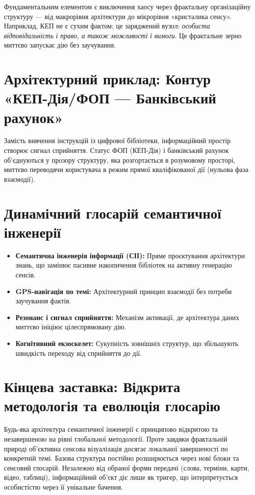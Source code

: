 \documentclass[11pt,a4paper]{article}
\begin{document}
Фундаментальним елементом є виключення хаосу через фрактальну організаційну структуру — від макрорівня архітектури до мікрорівня «кристалика сенсу». Наприклад, КЕП не є сухим фактом; це заряджений вузол: \textit{особиста відповідальність і право, а також можливості і вимоги}. Це фрактальне зерно миттєво запускає дію без заучування.

\section{Архітектурний приклад: Контур «КЕП-Дія/ФОП — Банківський рахунок»}
Замість вивчення інструкцій із цифрової бібліотеки, інформаційний простір створює сигнал сприйняття. Статус ФОП (КЕП-Дія) і банківський рахунок об'єднуються у прозору структуру, яка розгортається в розумовому просторі, миттєво переводячи користувача в режим прямої кваліфікованої дії (нульова фаза взаємодії).

\section{Динамічний глосарій семантичної інженерії}
\begin{itemize}
    \item \textbf{Семантична інженерія інформації (СІІ):} Пряме проєктування архітектури знань, що замінює пасивне накопичення бібліотек на активну генерацію сенсів.
    \item \textbf{GPS-навігація по темі:} Архітектурний принцип взаємодії без потреби заучування фактів.
    \item \textbf{Резонанс і сигнал сприйняття:} Механізм активації, де архітектура даних миттєво ініціює цілеспрямовану дію.
    \item \textbf{Когнітивний екзоскелет:} Сукупність зовнішніх структур, що збільшують швидкість переходу від сприйняття до дії.
\end{itemize}

\section{Кінцева заставка: Відкрита методологія та еволюція глосарію}
Будь-яка архітектура семантичної інженерії є принципово відкритою та незавершеною на рівні глобальної методології. Проте завдяки фрактальній природі об'єктивна сенсова візуалізація досягає локальної завершеності по конкретній темі. Базова структура постійно розширюється через нові блоки та сенсовий глосарій. Незалежно від обраної форми передачі (слова, терміни, карти, відео, таблиці), інформаційний об'єкт діє лише як тригер, що інтерпретується особистістю через її унікальне бачення.
\end{document}
